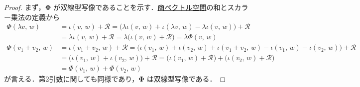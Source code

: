 \documentclass[geometry_main]{subfiles}
\begin{document}
\begin{proof}
	まず，$\bm{\Phi}$ が双線型写像であることを示す．\hyperref[prop:quotient-vec]{商ベクトル空間}の和とスカラー乗法の定義から
	\begin{align}
		\Phi (\lambda v,\, w) &= \iota(v,\, w) + \mathcal{R} = \bigl( \lambda \iota(v,\, w) + \iota (\lambda v,\, w) - \lambda \iota (v,\, w) \bigr) + \mathcal{R} \\
		&= \lambda \iota (v,\, w) + \mathcal{R} = \lambda \bigl( \iota(v,\, w) + \mathcal{R} \bigr) = \lambda \Phi(v,\, w) \\
		\Phi (v_1 + v_2,\, w) &= \iota(v_1 + v_2,\, w) + \mathcal{R} = \bigl( \iota(v_1,\, w) + \iota (v_2,\, w) + \iota(v_1+v_2,\, w) - \iota (v_1,\, w) - \iota(v_2,\, w) \bigr) + \mathcal{R} \\
		&= \bigl(\iota (v_1,\, w) + \iota (v_2,\, w) \bigr) + \mathcal{R} = \bigl( \iota(v_1,\, w) + \mathcal{R} \bigr) + \bigl( \iota(v_2,\, w) + \mathcal{R} \bigr) \\
		&= \Phi(v_1,\, w) + \Phi(v_2,\, w)
	\end{align}
	が言える．第2引数に関しても同様であり，$\bm{\Phi}$ は双線型写像である．


\end{proof}
\end{document}
